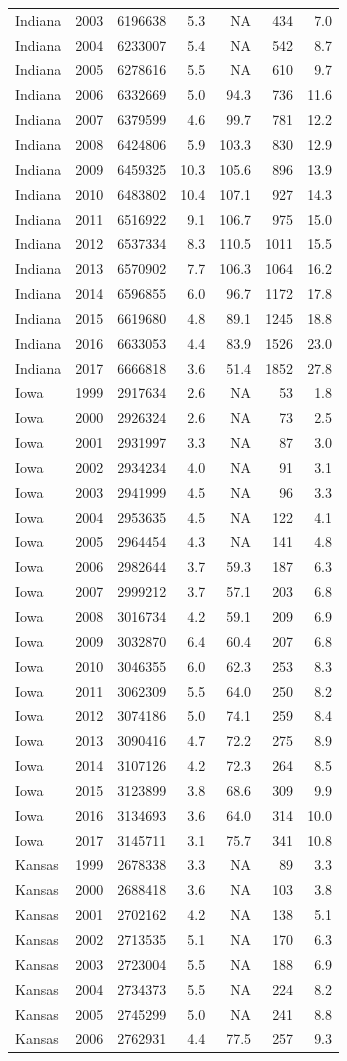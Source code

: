 \documentclass[
]{article}
\begin{document}
\begin{longtable}[]{@{}lrrrrrr@{}}
Indiana & 2003 & 6196638 & 5.3 & NA & 434 & 7.0\tabularnewline
Indiana & 2004 & 6233007 & 5.4 & NA & 542 & 8.7\tabularnewline
Indiana & 2005 & 6278616 & 5.5 & NA & 610 & 9.7\tabularnewline
Indiana & 2006 & 6332669 & 5.0 & 94.3 & 736 & 11.6\tabularnewline
Indiana & 2007 & 6379599 & 4.6 & 99.7 & 781 & 12.2\tabularnewline
Indiana & 2008 & 6424806 & 5.9 & 103.3 & 830 & 12.9\tabularnewline
Indiana & 2009 & 6459325 & 10.3 & 105.6 & 896 & 13.9\tabularnewline
Indiana & 2010 & 6483802 & 10.4 & 107.1 & 927 & 14.3\tabularnewline
Indiana & 2011 & 6516922 & 9.1 & 106.7 & 975 & 15.0\tabularnewline
Indiana & 2012 & 6537334 & 8.3 & 110.5 & 1011 & 15.5\tabularnewline
Indiana & 2013 & 6570902 & 7.7 & 106.3 & 1064 & 16.2\tabularnewline
Indiana & 2014 & 6596855 & 6.0 & 96.7 & 1172 & 17.8\tabularnewline
Indiana & 2015 & 6619680 & 4.8 & 89.1 & 1245 & 18.8\tabularnewline
Indiana & 2016 & 6633053 & 4.4 & 83.9 & 1526 & 23.0\tabularnewline
Indiana & 2017 & 6666818 & 3.6 & 51.4 & 1852 & 27.8\tabularnewline
Iowa & 1999 & 2917634 & 2.6 & NA & 53 & 1.8\tabularnewline
Iowa & 2000 & 2926324 & 2.6 & NA & 73 & 2.5\tabularnewline
Iowa & 2001 & 2931997 & 3.3 & NA & 87 & 3.0\tabularnewline
Iowa & 2002 & 2934234 & 4.0 & NA & 91 & 3.1\tabularnewline
Iowa & 2003 & 2941999 & 4.5 & NA & 96 & 3.3\tabularnewline
Iowa & 2004 & 2953635 & 4.5 & NA & 122 & 4.1\tabularnewline
Iowa & 2005 & 2964454 & 4.3 & NA & 141 & 4.8\tabularnewline
Iowa & 2006 & 2982644 & 3.7 & 59.3 & 187 & 6.3\tabularnewline
Iowa & 2007 & 2999212 & 3.7 & 57.1 & 203 & 6.8\tabularnewline
Iowa & 2008 & 3016734 & 4.2 & 59.1 & 209 & 6.9\tabularnewline
Iowa & 2009 & 3032870 & 6.4 & 60.4 & 207 & 6.8\tabularnewline
Iowa & 2010 & 3046355 & 6.0 & 62.3 & 253 & 8.3\tabularnewline
Iowa & 2011 & 3062309 & 5.5 & 64.0 & 250 & 8.2\tabularnewline
Iowa & 2012 & 3074186 & 5.0 & 74.1 & 259 & 8.4\tabularnewline
Iowa & 2013 & 3090416 & 4.7 & 72.2 & 275 & 8.9\tabularnewline
Iowa & 2014 & 3107126 & 4.2 & 72.3 & 264 & 8.5\tabularnewline
Iowa & 2015 & 3123899 & 3.8 & 68.6 & 309 & 9.9\tabularnewline
Iowa & 2016 & 3134693 & 3.6 & 64.0 & 314 & 10.0\tabularnewline
Iowa & 2017 & 3145711 & 3.1 & 75.7 & 341 & 10.8\tabularnewline
Kansas & 1999 & 2678338 & 3.3 & NA & 89 & 3.3\tabularnewline
Kansas & 2000 & 2688418 & 3.6 & NA & 103 & 3.8\tabularnewline
Kansas & 2001 & 2702162 & 4.2 & NA & 138 & 5.1\tabularnewline
Kansas & 2002 & 2713535 & 5.1 & NA & 170 & 6.3\tabularnewline
Kansas & 2003 & 2723004 & 5.5 & NA & 188 & 6.9\tabularnewline
Kansas & 2004 & 2734373 & 5.5 & NA & 224 & 8.2\tabularnewline
Kansas & 2005 & 2745299 & 5.0 & NA & 241 & 8.8\tabularnewline
Kansas & 2006 & 2762931 & 4.4 & 77.5 & 257 & 9.3\tabularnewline

\end{longtable}
\end{document}
